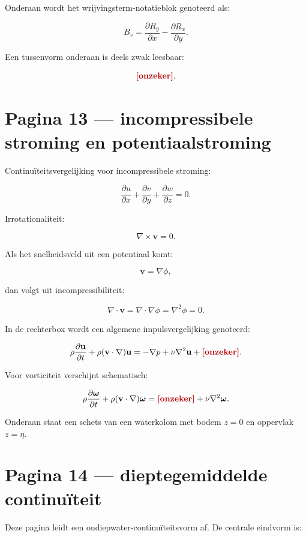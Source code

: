 \documentclass[11pt,a4paper]{article}
\newcommand{\onzeker}[1]{\ifmmode\text{\color{red!70!black}\bfseries[onzeker]}\else\textcolor{red!70!black}{\textbf{[onzeker:} #1\textbf{]}}\fi}
\newcommand{\vect}[1]{\mathbf{#1}}
\begin{document}
Onderaan wordt het wrijvingsterm-notatieblok genoteerd als:

$$
B_v
=
\frac{\partial R_y}{\partial x}
-
\frac{\partial R_x}{\partial y}.
$$

Een tussenvorm onderaan is deels zwak leesbaar:

$$
\onzeker{
\frac{\partial R_y}{\partial x}
-
\frac{\partial R_x}{\partial y}
\approx
-g\frac{\partial^2 h}{\partial x\,\partial y}
+
\frac{\partial R_y}{\partial x}
}.
$$

\newpage

\section*{Pagina 13 --- incompressibele stroming en potentiaalstroming}
Continuïteitsvergelijking voor incompressibele stroming:

$$
\frac{\partial u}{\partial x}
+
\frac{\partial v}{\partial y}
+
\frac{\partial w}{\partial z}
=
0.
$$

Irrotationaliteit:

$$
\nabla\times\vect{v}=0.
$$

Als het snelheidsveld uit een potentiaal komt:

$$
\vect{v}=\nabla\phi,
$$

dan volgt uit incompressibiliteit:

$$
\nabla\cdot\vect{v}
=
\nabla\cdot\nabla\phi
=
\nabla^2\phi
=
0.
$$

In de rechterbox wordt een algemene impulsvergelijking genoteerd:

$$
\rho\frac{\partial \vect{u}}{\partial t}
+
\rho(\vect{v}\cdot\nabla)\vect{u}
=
-\nabla p
+
\nu\nabla^2\vect{u}
+
\onzeker{\text{extra term}}.
$$

Voor vorticiteit verschijnt schematisch:

$$
\rho\frac{\partial\bm{\omega}}{\partial t}
+
\rho(\vect{v}\cdot\nabla)\bm{\omega}
=
\onzeker{\bm{\omega}\cdot\nabla\vect{v}}
+
\nu\nabla^2\bm{\omega}.
$$

Onderaan staat een schets van een waterkolom met bodem $z=0$ en oppervlak $z=\eta$.

\newpage

\section*{Pagina 14 --- dieptegemiddelde continuïteit}
Deze pagina leidt een ondiepwater-continuïteitsvorm af. De centrale eindvorm is:
\end{document}
